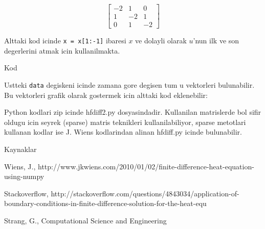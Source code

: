 \documentclass[12pt,fleqn]{article}\usepackage{../common}
\begin{document}
\[ \left[ \begin{array}{ccc}
-2 & 1 & 0  \\
1 & -2 & 1  \\
0 & 1 & -2 
\end{array} \right]
 \]

Alttaki kod icinde \verb!x = x[1:-1]! ibaresi $x$ ve dolayli olarak $u$'nun
ilk ve son degerlerini atmak icin kullanilmakta.

Kod



Ustteki \verb!data! degiskeni icinde zamana gore degisen tum u vektorleri
bulunabilir. Bu vektorleri grafik olarak gostermek icin alttaki kod eklenebilir:



Python kodlari zip icinde hfdiff2.py dosyasindadir. Kullanilan
matrislerde bol sifir oldugu icin seyrek (sparse) matris teknikleri
kullanilabiliyor, sparse metotlari kullanan kodlar ise J. Wiens
kodlarindan alinan hfdiff.py icinde bulunabilir.

Kaynaklar

Wiens, J., http://www.jkwiens.com/2010/01/02/finite-difference-heat-equation-using-numpy

Stackoverflow, http://stackoverflow.com/questions/4843034/application-of-boundary-conditions-in-finite-difference-solution-for-the-heat-equ

Strang, G., Computational Science and Engineering
\end{document}
